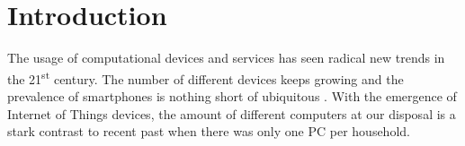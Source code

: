 \section{Introduction}

The usage of computational devices and services has seen radical new trends in the 21\textsuperscript{st} century. The number of different devices keeps growing and the prevalence of smartphones is nothing short of ubiquitous \cite{anderson2015technology}. With the emergence of Internet of Things devices, the amount of different computers at our disposal is a stark contrast to recent past when there was only one PC per household.